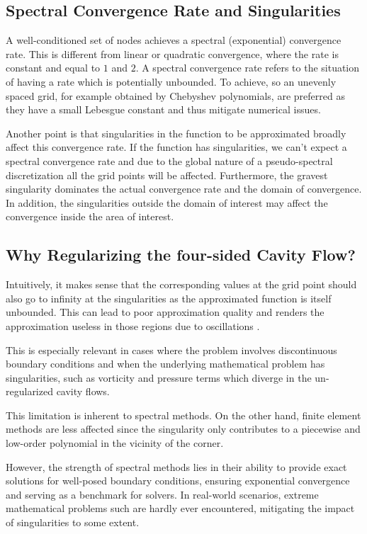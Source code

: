\subsection{Spectral Convergence Rate and Singularities}

A well-conditioned set of nodes achieves a spectral (exponential) convergence
\citep{meseguer2020} rate. This is different from linear or quadratic
convergence, where the rate is constant and equal to $1$ and $2$. A spectral
convergence rate refers to the situation of having a rate which is potentially
unbounded. To achieve, so an unevenly spaced grid, for example obtained by
Chebyshev polynomials, are preferred as they have a small Lebesgue constant
and thus mitigate numerical issues. 

Another point is that singularities in the function to be approximated broadly
affect this convergence rate. If the function has singularities, we can't
expect a spectral convergence rate and due to the global nature of a
pseudo-spectral discretization all the grid points will be affected.
Furthermore, the gravest singularity dominates the actual convergence rate and
the domain of convergence. In addition, the singularities outside the domain of
interest may affect the convergence inside the area of interest. 

\subsection{Why Regularizing the four-sided Cavity Flow?}

Intuitively, it makes sense that the corresponding values at the grid point
should also go to infinity at the singularities as the approximated function is
itself unbounded. This can lead to poor approximation quality and renders the
approximation useless in those regions due to oscillations \citep{canuto2006}.

This is especially relevant in cases where the problem involves discontinuous
boundary conditions and when the underlying mathematical problem has
singularities, such as vorticity and pressure terms which diverge in the
un-regularized cavity flows.

This limitation is inherent to spectral methods. On the other hand, finite
element methods are less affected since the singularity only contributes to a
piecewise and low-order polynomial in the vicinity of the corner.

However, the strength of spectral methods lies in their ability to provide
exact solutions for well-posed boundary conditions, ensuring exponential
convergence and serving as a benchmark for solvers. In real-world scenarios,
extreme mathematical problems such are hardly ever encountered, mitigating the
impact of singularities to some extent.

